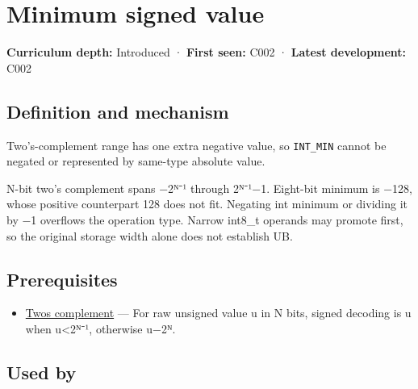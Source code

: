 \hypertarget{appendix-05f39b10364d}{}\label{referencestart:appendix-05f39b10364d}
\section{Minimum signed value}\label{appendix-05f39b10364d-minimum-signed-value}

\hypertarget{appendix-05f39b10364d-minimum-signed-value}{}

\textbf{Curriculum depth:} Introduced · \textbf{First seen:} C002 · \textbf{Latest development:} C002

\begin{allmightroledefinition}

\subsection{Definition and mechanism}\label{appendix-05f39b10364d-definition-and-mechanism}

\hypertarget{appendix-05f39b10364d-definition-and-mechanism}{}

Two's-complement range has one extra negative value, so \texttt{INT\_MIN} cannot be negated or represented by same-type absolute value.

\end{allmightroledefinition}

N-bit two's complement spans −2ᴺ⁻¹ through 2ᴺ⁻¹−1. Eight-bit minimum is −128, whose positive counterpart 128 does not fit. Negating int minimum or dividing it by −1 overflows the operation type. Narrow int8\_t operands may promote first, so the original storage width alone does not establish UB.

\subsection{Prerequisites}\label{appendix-05f39b10364d-prerequisites}

\hypertarget{appendix-05f39b10364d-prerequisites}{}

\begin{itemize}
\tightlist
\item
  \hyperref[appendix-4fbc03d20829]{Two\textquotesingle s complement} --- For raw unsigned value u in N bits, signed decoding is u when u\textless2ᴺ⁻¹, otherwise u−2ᴺ.
\end{itemize}

\subsection{Used by}\label{appendix-05f39b10364d-used-by}

